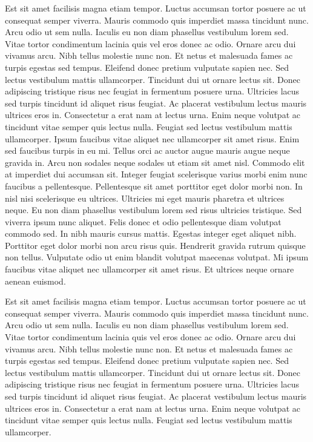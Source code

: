 \documentclass[11pt]{article}
\begin{document}
\par Est sit amet facilisis magna etiam tempor. Luctus accumsan tortor posuere ac ut consequat semper viverra. Mauris commodo quis imperdiet massa tincidunt nunc. Arcu odio ut sem nulla. Iaculis eu non diam phasellus vestibulum lorem sed. Vitae tortor condimentum lacinia quis vel eros donec ac odio. Ornare arcu dui vivamus arcu. Nibh tellus molestie nunc non. Et netus et malesuada fames ac turpis egestas sed tempus. Eleifend donec pretium vulputate sapien nec. Sed lectus vestibulum mattis ullamcorper. Tincidunt dui ut ornare lectus sit. Donec adipiscing tristique risus nec feugiat in fermentum posuere urna. Ultricies lacus sed turpis tincidunt id aliquet risus feugiat. Ac placerat vestibulum lectus mauris ultrices eros in. Consectetur a erat nam at lectus urna. Enim neque volutpat ac tincidunt vitae semper quis lectus nulla. Feugiat sed lectus vestibulum mattis ullamcorper. Ipsum faucibus vitae aliquet nec ullamcorper sit amet risus. Enim sed faucibus turpis in eu mi. Tellus orci ac auctor augue mauris augue neque gravida in. Arcu non sodales neque sodales ut etiam sit amet nisl. Commodo elit at imperdiet dui accumsan sit. Integer feugiat scelerisque varius morbi enim nunc faucibus a pellentesque. Pellentesque sit amet porttitor eget dolor morbi non. In nisl nisi scelerisque eu ultrices. Ultricies mi eget mauris pharetra et ultrices neque. Eu non diam phasellus vestibulum lorem sed risus ultricies tristique. Sed viverra ipsum nunc aliquet. Felis donec et odio pellentesque diam volutpat commodo sed. In nibh mauris cursus mattis. Egestas integer eget aliquet nibh. Porttitor eget dolor morbi non arcu risus quis. Hendrerit gravida rutrum quisque non tellus. Vulputate odio ut enim blandit volutpat maecenas volutpat. Mi ipsum faucibus vitae aliquet nec ullamcorper sit amet risus. Et ultrices neque ornare aenean euismod.

\par Est sit amet facilisis magna etiam tempor. Luctus accumsan tortor posuere ac ut consequat semper viverra. Mauris commodo quis imperdiet massa tincidunt nunc. Arcu odio ut sem nulla. Iaculis eu non diam phasellus vestibulum lorem sed. Vitae tortor condimentum lacinia quis vel eros donec ac odio. Ornare arcu dui vivamus arcu. Nibh tellus molestie nunc non. Et netus et malesuada fames ac turpis egestas sed tempus. Eleifend donec pretium vulputate sapien nec. Sed lectus vestibulum mattis ullamcorper. Tincidunt dui ut ornare lectus sit. Donec adipiscing tristique risus nec feugiat in fermentum posuere urna. Ultricies lacus sed turpis tincidunt id aliquet risus feugiat. Ac placerat vestibulum lectus mauris ultrices eros in. Consectetur a erat nam at lectus urna. Enim neque volutpat ac tincidunt vitae semper quis lectus nulla. Feugiat sed lectus vestibulum mattis ullamcorper.
		
\end{document}

